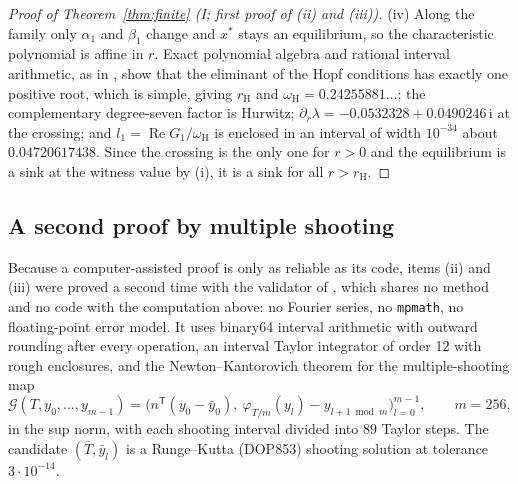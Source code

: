 \documentclass[11pt,a4paper]{article}
\theoremstyle{plain}
\theoremstyle{definition}
\theoremstyle{remark}
\newcommand{\ii}{\mathrm i}
\newcommand{\T}{\mathsf T}
\DeclareMathOperator{\Ree}{Re}
\newcommand{\evI}{\textsf{I}}
\begin{document}
\begin{proof}[Proof of Theorem~\ref{thm:finite} \textup{(\evI; first proof of (ii) and (iii))}]
(iv) Along the family only $\alpha_1$ and $\beta_1$ change and $x^*$ stays an equilibrium, so the characteristic polynomial is affine in $r$. Exact polynomial algebra and rational interval arithmetic, as in \cite{CompanionOscillations}, show that the eliminant of the Hopf conditions has exactly one positive root, which is simple, giving $r_{\mathrm H}$ and $\omega_{\mathrm H}=0.24255881\ldots$; the complementary degree-seven factor is Hurwitz; $\partial_r\lambda=-0.0532328+0.0490246\,\ii$ at the crossing; and $l_1=\Ree G_1/\omega_{\mathrm H}$ is enclosed in an interval of width $10^{-34}$ about $0.04720617438$. Since the crossing is the only one for $r>0$ and the equilibrium is a sink at the witness value by (i), it is a sink for all $r>r_{\mathrm H}$.
\end{proof}

\subsection{A second proof by multiple shooting}
Because a computer-assisted proof is only as reliable as its code, items (ii) and (iii) were proved a second time with the validator of \cite{CompanionOscillations}, which shares no method and no code with the computation above: no Fourier series, no \texttt{mpmath}, no floating-point error model. It uses binary64 interval arithmetic with outward rounding after every operation, an interval Taylor integrator of order 12 with rough enclosures, and the Newton--Kantorovich theorem for the multiple-shooting map
\[
\mathcal G(T,y_0,\dots,y_{m-1})=\bigl(n^\T(y_0-\bar y_0),\ \varphi_{T/m}(y_l)-y_{l+1\bmod m}\bigr)_{l=0}^{m-1},\qquad m=256,
\]
in the sup norm, with each shooting interval divided into $89$ Taylor steps. The candidate $(\bar T,\bar y_l)$ is a Runge--Kutta (DOP853) shooting solution at tolerance $3\cdot10^{-14}$.
\end{document}
